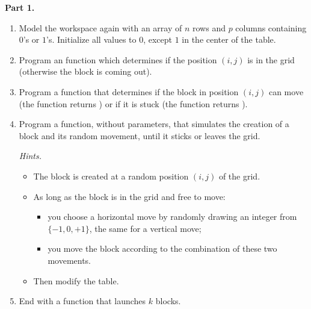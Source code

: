 \documentclass[11pt,class=report,crop=false]{standalone}
\begin{document}

\begin{activite}


\textbf{Part 1.}

\begin{enumerate}
  \item Model the workspace again with an array of $n$ rows and $p$ columns containing $0$'s or $1$'s. Initialize all values to $0$, except $1$ in the center of the table.
  
  \item Program an  function which determines if the position $(i,j)$ is in the grid (otherwise the block is coming out).
    
  \item Program a  function that determines if the block in position $(i,j)$ can move (the function returns ) or if it is stuck (the function returns ).

  \item Program a  function, without parameters, that simulates the creation of a block and its random movement, until it sticks or leaves the grid.
  
  \emph{Hints.}
  \begin{itemize}
    \item The block is created at a random position $(i,j)$ of the grid.
    \item As long as the block is in the grid and free to move:
    \begin{itemize}
      \item you choose a horizontal move by randomly drawing an integer from $\{-1,0,+1\}$, the same for a vertical move;
      \item you move the block according to the combination of these two movements.
    \end{itemize}  
    \item Then modify the table.      
  \end{itemize}

  
    \item End with a  function that launches $k$ blocks.   
\end{enumerate}



\end{activite}
\end{document}
